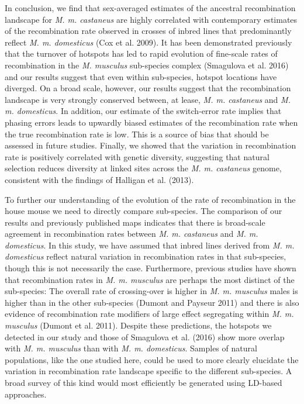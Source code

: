 In conclusion, we find that sex-averaged estimates of the ancestral recombination landscape for \emph{M. m. castaneus} are highly correlated with contemporary estimates of the recombination rate observed in crosses of inbred lines that predominantly reflect \emph{M. m. domesticus} (Cox et al. 2009). It has been demonstrated previously that the turnover of hotspots has led to rapid evolution of fine-scale rates of recombination in the \emph{M. musculus} sub-species complex (Smagulova et al. 2016) and our results suggest that even within sub-species, hotspot locations have diverged. On a broad scale, however, our results suggest that the recombination landscape is very strongly conserved between, at lease, \emph{M. m. castaneus} and \emph{M. m. domesticus}. In addition, our estimate of the switch-error rate implies that phasing errors leads to upwardly biased estimates of the recombination rate when the true recombination rate is low. This is a source of bias that should be assessed in future studies. Finally, we showed that the variation in recombination rate is positively correlated with genetic diversity, suggesting that natural selection reduces diversity at linked sites across the \emph{M. m. castaneus} genome, consistent with the findings of Halligan et al. (2013). 
 
To further our understanding of the evolution of the rate of recombination in the house mouse we need to directly compare sub-species. The comparison of our results and previously published maps indicates that there is broad-scale agreement in recombination rates between \emph{M. m. castaneus} and \emph{M. m. domesticus}. In this study, we have assumed that inbred lines derived from \emph{M. m. domesticus} reflect natural variation in recombination rates in that sub-species, though this is not necessarily the case.  Furthermore, previous studies have shown that recombination rates in \emph{M. m. musculus} are perhaps the most distinct of the sub-species: The overall rate of crossing-over is higher in \emph{M. m. musculus} males is higher than in the other sub-species (Dumont and Payseur 2011) and there is also evidence of recombination rate modifiers of large effect segregating within \emph{M. m. musculus} (Dumont et al. 2011). Despite these predictions, the hotspots we detected in our study and those of Smagulova et al. (2016) show more overlap with \emph{M. m. musculus} than with \emph{M. m. domesticus}. Samples of natural populations, like the one studied here, could be used to more clearly elucidate the variation in recombination rate landscape specific to the different sub-species. A broad survey of this kind would most efficiently be generated using LD-based approaches.  
